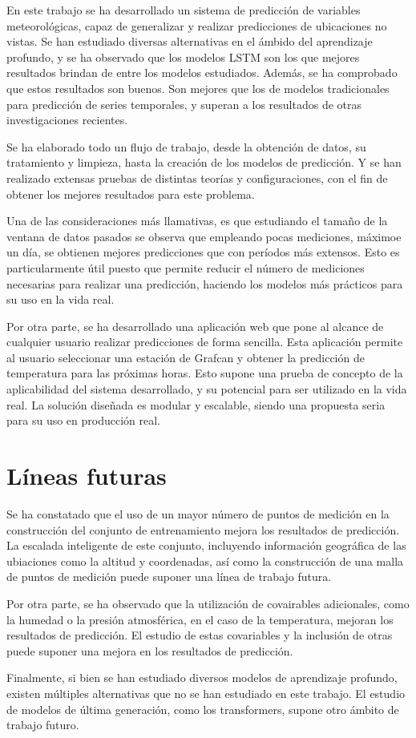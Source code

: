 
En este trabajo se ha desarrollado un sistema de predicción de variables meteorológicas, capaz de generalizar y realizar predicciones de ubicaciones no vistas. 
Se han estudiado diversas alternativas en el ámbido del aprendizaje profundo, y se ha observado que los modelos LSTM son los que mejores resultados brindan de entre los modelos estudiados. Además,
se ha comprobado que estos resultados son buenos. Son mejores que los de modelos tradicionales para predicción de series temporales, y superan a los resultados de otras investigaciones 
recientes.

Se ha elaborado todo un flujo de trabajo, desde la obtención de datos, su tratamiento y limpieza, hasta la creación de los modelos de predicción. Y se han 
realizado extensas pruebas de distintas teorías y configuraciones, con el fin de obtener los mejores resultados para este problema.

Una de las consideraciones más llamativas, es que estudiando el tamaño de la ventana de datos pasados se observa que empleando pocas mediciones, máximoe un día, se obtienen mejores predicciones que
con períodos más extensos. Esto es particularmente útil puesto que permite reducir el número de mediciones necesarias para realizar una predicción, haciendo los modelos 
más prácticos para su uso en la vida real.

Por otra parte, se ha desarrollado una aplicación web que pone al alcance de cualquier usuario realizar predicciones de forma sencilla. 
Esta aplicación permite al usuario seleccionar una estación de Grafcan y obtener la predicción de temperatura para las próximas horas.
Esto supone una prueba de concepto de la aplicabilidad del sistema desarrollado, y su potencial para ser utilizado en la vida real. La solución diseñada
es modular y escalable, siendo una propuesta seria para su uso en producción real.

\section{Líneas futuras}

Se ha constatado que el uso de un mayor número de puntos de medición en la construcción del conjunto de entrenamiento mejora los resultados de predicción.
La escalada inteligente de este conjunto, incluyendo información geográfica de las ubiaciones como la altitud y coordenadas, así como la construcción de una malla 
de puntos de medición puede suponer una línea de trabajo futura.

Por otra parte, se ha observado que la utilización de covairables adicionales, como la humedad o la presión atmosférica, en el caso de la temperatura, mejoran los resultados de predicción.
El estudio de estas covariables y la inclusión de otras puede suponer una mejora en los resultados de predicción.

Finalmente, si bien se han estudiado diversos modelos de aprendizaje profundo, existen múltiples alternativas que no se han estudiado en este trabajo.
El estudio de modelos de última generación, como los transformers, supone otro ámbito de trabajo futuro.